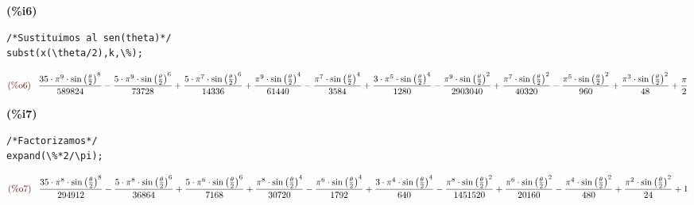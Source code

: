 \documentclass[12pt]{article}
\begin{document}
\noindent
\begin{minipage}[t]{8ex}\color{red}\bf
(\%i6) 
\end{minipage}
\begin{minipage}[t]{\textwidth}\color{blue}
\begin{verbatim}
/*Sustituimos al sen(theta)*/
subst(x(\theta/2),k,\%);
\end{verbatim}
\end{minipage}
\begin{math}
\displaystyle
\parbox{8ex}{\color{labelcolor}(\%o6) }
\frac{35\cdot {{\pi}^{9}}\cdot {{\mathrm{sin}\left( \frac{\theta}{2}\right) }^{8}}}{589824}-\frac{5\cdot {{\pi}^{9}}\cdot {{\mathrm{sin}\left( \frac{\theta}{2}\right) }^{6}}}{73728}+\frac{5\cdot {{\pi}^{7}}\cdot {{\mathrm{sin}\left( \frac{\theta}{2}\right) }^{6}}}{14336}+\frac{{{\pi}^{9}}\cdot {{\mathrm{sin}\left( \frac{\theta}{2}\right) }^{4}}}{61440}-\frac{{{\pi}^{7}}\cdot {{\mathrm{sin}\left( \frac{\theta}{2}\right) }^{4}}}{3584}+\frac{3\cdot {{\pi}^{5}}\cdot {{\mathrm{sin}\left( \frac{\theta}{2}\right) }^{4}}}{1280}-\frac{{{\pi}^{9}}\cdot {{\mathrm{sin}\left( \frac{\theta}{2}\right) }^{2}}}{2903040}+\frac{{{\pi}^{7}}\cdot {{\mathrm{sin}\left( \frac{\theta}{2}\right) }^{2}}}{40320}-\frac{{{\pi}^{5}}\cdot {{\mathrm{sin}\left( \frac{\theta}{2}\right) }^{2}}}{960}+\frac{{{\pi}^{3}}\cdot {{\mathrm{sin}\left( \frac{\theta}{2}\right) }^{2}}}{48}+\frac{\pi}{2}\mbox{}
\end{math}

\noindent
\begin{minipage}[t]{8ex}\color{red}\bf
(\%i7) 
\end{minipage}
\begin{minipage}[t]{\textwidth}\color{blue}
\begin{verbatim}
/*Factorizamos*/
expand(\%*2/\pi);
\end{verbatim}
\end{minipage}
\begin{math}
\displaystyle
\parbox{8ex}{\color{labelcolor}(\%o7) }
\frac{35\cdot {{\pi}^{8}}\cdot {{\mathrm{sin}\left( \frac{\theta}{2}\right) }^{8}}}{294912}-\frac{5\cdot {{\pi}^{8}}\cdot {{\mathrm{sin}\left( \frac{\theta}{2}\right) }^{6}}}{36864}+\frac{5\cdot {{\pi}^{6}}\cdot {{\mathrm{sin}\left( \frac{\theta}{2}\right) }^{6}}}{7168}+\frac{{{\pi}^{8}}\cdot {{\mathrm{sin}\left( \frac{\theta}{2}\right) }^{4}}}{30720}-\frac{{{\pi}^{6}}\cdot {{\mathrm{sin}\left( \frac{\theta}{2}\right) }^{4}}}{1792}+\frac{3\cdot {{\pi}^{4}}\cdot {{\mathrm{sin}\left( \frac{\theta}{2}\right) }^{4}}}{640}-\frac{{{\pi}^{8}}\cdot {{\mathrm{sin}\left( \frac{\theta}{2}\right) }^{2}}}{1451520}+\frac{{{\pi}^{6}}\cdot {{\mathrm{sin}\left( \frac{\theta}{2}\right) }^{2}}}{20160}-\frac{{{\pi}^{4}}\cdot {{\mathrm{sin}\left( \frac{\theta}{2}\right) }^{2}}}{480}+\frac{{{\pi}^{2}}\cdot {{\mathrm{sin}\left( \frac{\theta}{2}\right) }^{2}}}{24}+1\mbox{}
\end{math}
\end{document}
